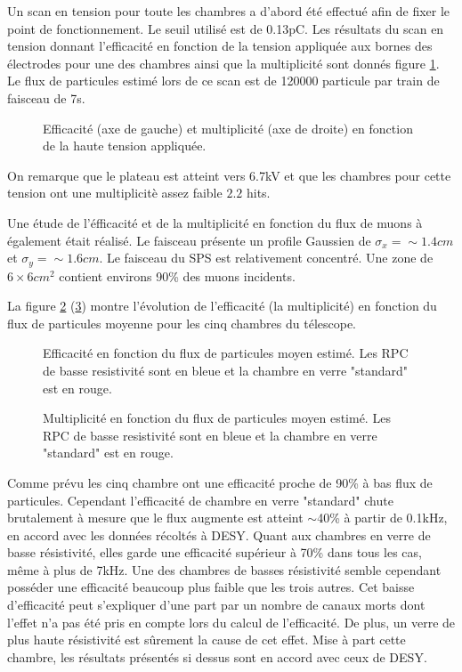Un scan en tension pour toute les chambres a d'abord été effectué afin de fixer le point de fonctionnement. Le seuil utilisé est de 0.13pC. Les résultats du scan en tension donnant l’efficacité en fonction de la tension appliquée aux bornes des électrodes pour une des chambres ainsi que la multiplicité sont donnés figure \ref{HVSPS}. Le flux de particules estimé lors de ce scan est de 120000 particule par train de faisceau de 7s.

\begin{figure}[!ht]
	\centering
	\scalebox{1.4}{}
	\caption{Efficacité (axe de gauche) et multiplicité (axe de droite) en fonction de la haute tension appliquée.}
	\label{HVSPS}
\end{figure}

On remarque que le plateau est atteint vers 6.7kV et que les chambres pour cette tension ont une multiplicitè assez faible $2.2$ hits. 

Une étude de l'éfficacité et de la multiplicité en fonction du flux de muons à également était réalisé. Le faisceau présente un profile Gaussien de $\sigma_{x}=\sim 1.4cm$ et $\sigma_{y}=\sim 1.6cm$. Le faisceau du SPS est relativement concentré. Une zone de $6\times6cm^{2}$ contient environs 90\% des muons incidents.

La figure \ref{RateSPS} (\ref{MultiplictySPS}) montre l'évolution de l'efficacité (la multiplicité) en fonction du flux de particules moyenne pour les cinq chambres du télescope.

\begin{figure}[!ht]
	\centering
	\scalebox{1.4}{}
	\caption{Efficacité en fonction du flux de particules moyen estimé. Les RPC de basse resistivité sont en bleue et la chambre en verre "standard" est en rouge.}
	\label{RateSPS}
\end{figure}

\begin{figure}[!ht]
	\centering
	\scalebox{1.6}{}
	\caption{Multiplicité en fonction du flux de particules moyen estimé. Les RPC de basse resistivité sont en bleue et la chambre en verre "standard" est en rouge.}
	\label{MultiplictySPS}
\end{figure}

Comme prévu les cinq chambre ont une efficacité proche de 90\% à bas flux de particules. Cependant l'efficacité de  chambre en verre "standard" chute brutalement à mesure que le flux augmente est atteint $\sim $40\% à partir de 0.1kHz, en accord avec les données récoltés à DESY. Quant aux chambres en verre de basse résistivité, elles garde une efficacité supérieur à 70\% dans tous les cas, même à plus de 7kHz. Une des chambres de basses résistivité semble cependant posséder une efficacité beaucoup plus faible que les trois autres. Cet baisse d'efficacité peut s'expliquer d'une part par un nombre de canaux morts dont l'effet n'a pas été pris en compte lors du calcul de l'efficacité. De plus, un verre de plus haute résistivité est sûrement la cause de cet effet. Mise à part cette chambre, les résultats présentés si dessus sont en accord avec ceux de DESY.


